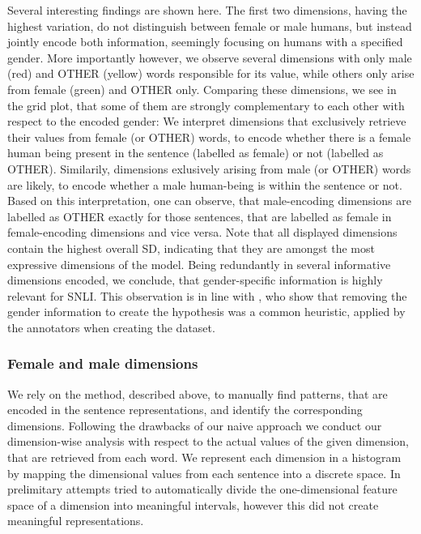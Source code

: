 Several interesting findings are shown here. The first two dimensions, having the highest variation, do not distinguish between female or male humans, but instead jointly encode both information, seemingly focusing on humans with a specified gender. More importantly however, we observe several dimensions with only male (red) and OTHER (yellow) words responsible for its value, while others only arise from female (green) and OTHER only. Comparing these dimensions, we see in the grid plot, that some of them are strongly complementary to each other with respect to the encoded gender: We interpret dimensions that exclusively retrieve their values from female (or OTHER) words, to encode whether there is a female human being present in the sentence (labelled as female) or not (labelled as OTHER). Similarily, dimensions exlusively arising from male (or OTHER) words are likely, to encode whether a male human-being is within the sentence or not. Based on this interpretation, one can observe, that male-encoding dimensions are labelled as OTHER exactly for those sentences, that are labelled as female in female-encoding dimensions and vice versa. Note that all displayed dimensions contain the highest overall \ac{SD}, indicating that they are amongst the most expressive dimensions of the model. Being redundantly in several informative dimensions encoded, we conclude, that gender-specific information is highly relevant for \ac{SNLI}. This observation is in line with \cite{gururangan2018annotation}, who show that removing the gender information to create the hypothesis was a common heuristic, applied by the annotators when creating the dataset.

\subsubsection{Female and male dimensions}\label{sec:understanding2}
We rely on the method, described above, to manually find patterns, that are encoded in the sentence representations, and identify the corresponding dimensions. Following the drawbacks of our naive approach we conduct our dimension-wise analysis with respect to the actual values of the given dimension, that are retrieved from each word. We represent each dimension in a histogram by mapping the dimensional values from each sentence into a discrete space. In prelimitary attempts tried to automatically divide the one-dimensional feature space of a dimension into meaningful intervals, however this did not create meaningful representations. 
